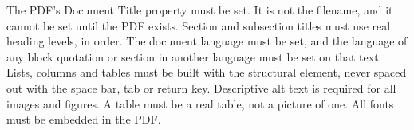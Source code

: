 %
%




\thesissetchapteropening{2in}

\thesisrequiretagging
\thesisrequiredocumentlanguage
{}
	{The PDF's Document Title property must be set. It is not the filename, and
	 it cannot be set until the PDF exists.}
	{Section and subsection titles must use real heading levels, in order.}
	{The document language must be set, and the language of any block quotation
	 or section in another language must be set on that text.}
	{Lists, columns and tables must be built with the structural element, never
	 spaced out with the space bar, tab or return key.}
	{Descriptive alt text is required for all images and figures. A table must
	 be a real table, not a picture of one.}
	{All fonts must be embedded in the PDF.}

